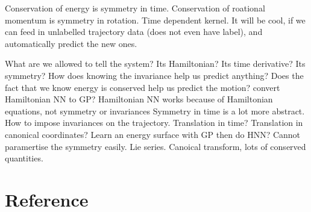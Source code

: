 \documentclass{article}
\begin{document}
Conservation of energy is symmetry in time.
Conservation of roational momentum is symmetry in rotation.
Time dependent kernel.
It will be cool, if we can feed in unlabelled trajectory data (does not even have label), and automatically predict the new ones.

What are we allowed to tell the system?
Its Hamiltonian?
Its time derivative?
Its symmetry?
How does knowing the invariance help us predict anything?
Does the fact that we know energy is conserved help us predict the motion?
convert Hamiltonian NN to GP?
Hamiltonian NN works because of Hamiltonian equations, not symmetry or invariances
Symmetry in time is a lot more abstract.
How to impose invariances on the trajectory.
Translation in time?
Translation in canonical coordinates?
Learn an energy surface with GP then do HNN?
Cannot paramertise the symmetry easily.
Lie series.
Canoical transform, lots of conserved quantities.



\section*{Reference}
\end{document}
